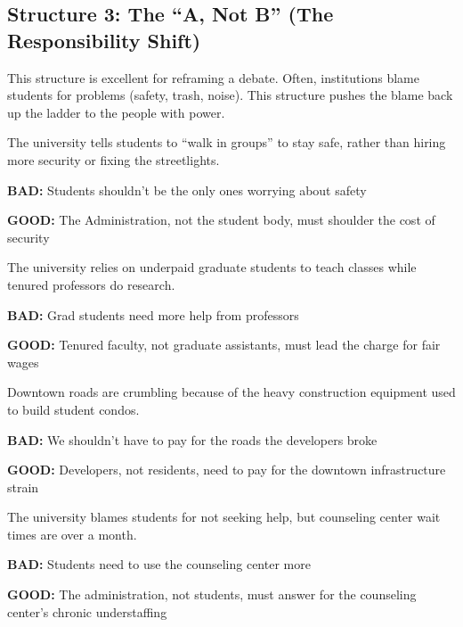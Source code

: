 \documentclass[12pt]{article}
\newcommand{\bad}[1]{\textbf{\textcolor{rose}{BAD:}} #1}
\newcommand{\good}[1]{\textbf{\textcolor{congaree}{GOOD:}} #1}
\newcommand{\context}[1]{#1}
\begin{document}
\newpage
\subsection{Structure 3: The ``A, Not B'' (The Responsibility Shift)}
This structure is excellent for reframing a debate. Often, institutions blame students for problems (safety, trash, noise). This structure pushes the blame back up the ladder to the people with power.

\begin{exampleblock}
\context{The university tells students to ``walk in groups'' to stay safe, rather than hiring more security or fixing the streetlights.}

\bad{Students shouldn't be the only ones worrying about safety}

\good{The Administration, not the student body, must shoulder the cost of security}
\end{exampleblock}

\begin{exampleblock}
\context{The university relies on underpaid graduate students to teach classes while tenured professors do research.}

\bad{Grad students need more help from professors}

\good{Tenured faculty, not graduate assistants, must lead the charge for fair wages}
\end{exampleblock}

\begin{exampleblock}
\context{Downtown roads are crumbling because of the heavy construction equipment used to build student condos.}

\bad{We shouldn't have to pay for the roads the developers broke}

\good{Developers, not residents, need to pay for the downtown infrastructure strain}
\end{exampleblock}

\begin{exampleblock}
\context{The university blames students for not seeking help, but counseling center wait times are over a month.}

\bad{Students need to use the counseling center more}

\good{The administration, not students, must answer for the counseling center's chronic understaffing}
\end{exampleblock}
\end{document}
